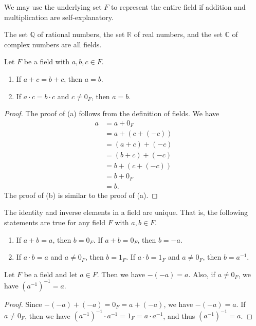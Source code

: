 \begin{remark}
  We may use the underlying set $F$ to represent the entire field if addition
  and multiplication are self-explanatory.
\end{remark}

\begin{examples}
  The set $\mathbb{Q}$ of rational numbers, the set $\mathbb{R}$ of real
  numbers, and the set $\mathbb{C}$ of complex numbers are all fields.
\end{examples}

\begin{theorem}
  \label{thm:cancellation-law}
  Let $F$ be a field with $a, b, c \in F$.
  \begin{enumerate}
    \item If $a + c = b + c$, then $a = b$.
    \item If $a \cdot c = b \cdot c$ and $c \neq 0_F$, then $a = b$.
  \end{enumerate}
\end{theorem}
\begin{proof}
  The proof of (a) follows from the definition of fields.
  We have
  \begin{align*}
    a
    &= a + 0_F \\
    &= a + (c + (-c)) \\
    &= (a + c) + (-c) \\
    &= (b + c) + (-c) \\
    &= b + (c + (-c)) \\
    &= b + 0_F \\
    &= b.      
  \end{align*}
  The proof of (b) is similar to the proof of (a).
\end{proof}

\begin{corollary}
  The identity and inverse elements in a field are unique.
  That is, the following statements are true for any field $F$ with
  $a, b \in F$.
  \begin{enumerate}
    \item If $a + b = a$, then $b = 0_F$.
    If $a + b = 0_F$, then $b = -a$.
    \item If $a \cdot b = a$ and $a \neq 0_F$, then $b = 1_F$.
    If $a \cdot b = 1_F$ and $a \neq 0_F$, then $b = a^{-1}$.
  \end{enumerate}
\end{corollary}

\begin{theorem}
  Let $F$ be a field and let $a \in F$.
  Then we have $-(-a) = a$.
  Also, if $a \neq 0_F$, we have $(a^{-1})^{-1} = a$.
\end{theorem}
\begin{proof}
  Since $-(-a) + (-a) = 0_F = a + (-a)$, we have $-(-a) = a$.
  If $a \neq 0_F$, then we have $(a^{-1})^{-1} \cdot a^{-1} = 1_F = a \cdot
  a^{-1}$, and thus $(a^{-1})^{-1} = a$.
\end{proof}

